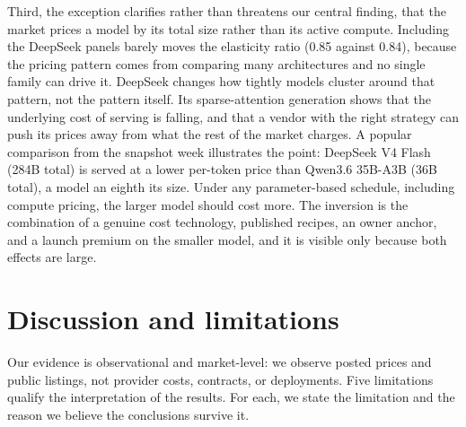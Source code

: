 \documentclass[11pt]{article}
\begin{document}
Third, the exception clarifies rather than threatens our central finding,
that the market prices a model by its total size rather than its active
compute. Including the DeepSeek panels barely moves the elasticity ratio
(0.85 against 0.84), because the pricing pattern comes from comparing many
architectures and no single family can drive it. DeepSeek changes how
tightly models cluster around that pattern, not the pattern itself. Its
sparse-attention generation shows that the underlying cost of serving is
falling, and that a vendor with the right strategy can push its prices away
from what the rest of the market charges. A popular comparison from the
snapshot week illustrates the point: DeepSeek V4 Flash (284B total) is
served at a lower per-token price than Qwen3.6 35B-A3B (36B total), a
model an eighth its size. Under any parameter-based schedule, including
compute pricing, the larger model should cost more. The inversion is the
combination of a genuine cost technology, published recipes, an owner
anchor, and a launch premium on the smaller model, and it is visible only
because both effects are large.

\section{Discussion and limitations}

Our evidence is observational and market-level: we observe posted prices and
public listings, not provider costs, contracts, or deployments. Five
limitations qualify the interpretation of the results. For each, we state the
limitation and the reason we believe the conclusions survive it.
\end{document}
